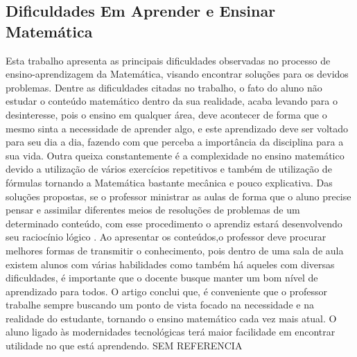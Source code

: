 \documentclass[12pt,a4paper]{article}
\begin{document}
\subsection{Dificuldades Em Aprender e Ensinar Matemática}
Esta trabalho apresenta as principais dificuldades observadas no processo de ensino-aprendizagem da Matemática, visando encontrar soluções para os devidos problemas.
Dentre as dificuldades citadas no trabalho, o fato do aluno não estudar o conteúdo matemático dentro da sua realidade, acaba levando para o desinteresse, pois o ensino em qualquer área, deve acontecer de forma que o mesmo sinta a necessidade de aprender algo, e este aprendizado deve ser voltado para seu dia a dia, fazendo com que perceba a importância da disciplina para a sua vida. 
Outra queixa constantemente é a complexidade no ensino matemático devido a utilização de vários exercícios repetitivos e também de utilização de fórmulas tornando a Matemática bastante mecânica e pouco explicativa. 
Das soluções propostas, se o professor ministrar as aulas de forma que o aluno precise pensar e assimilar diferentes meios de resoluções de problemas de um determinado conteúdo, com esse procedimento o aprendiz estará desenvolvendo seu raciocínio lógico . Ao apresentar os conteúdos,o professor deve procurar melhores formas de transmitir o conhecimento, pois dentro de uma sala de aula existem alunos com várias habilidades como também há aqueles com diversas dificuldades, é importante que o docente busque manter um bom nível de aprendizado para todos.
O artigo conclui que, é conveniente que o professor trabalhe sempre buscando um ponto de vista focado na necessidade e na realidade do estudante, tornando o ensino matemático cada vez mais atual. O aluno ligado às modernidades tecnológicas terá maior facilidade em encontrar utilidade no que está aprendendo. SEM REFERENCIA
\end{document}
